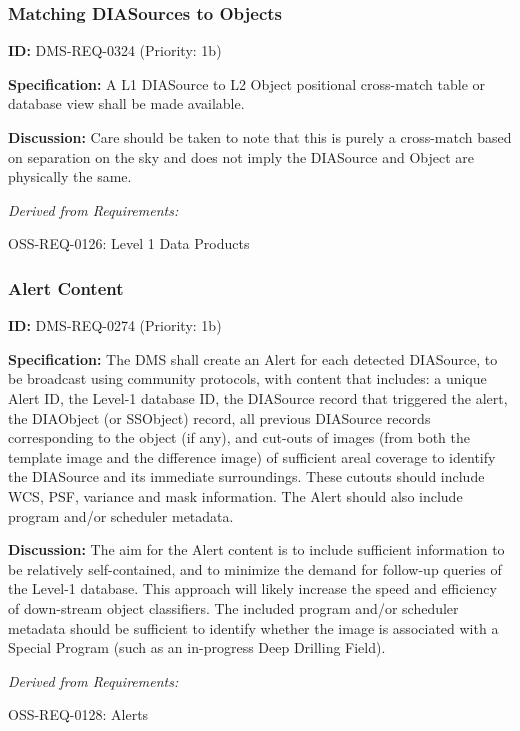 \documentclass[SE,toc,lsstdraft]{lsstdoc}
\begin{document}
\subsubsection{Matching DIASources to Objects}

\label{DMS-REQ-0324}
\textbf{ID:} DMS-REQ-0324 (Priority: 1b)

\textbf{Specification:} A L1 DIASource to L2 Object positional cross-match table or database view shall be made available.

\textbf{Discussion:} Care should be taken to note that this is purely a cross-match based on separation on the sky and does not imply the DIASource and Object are physically the same.

\emph{Derived from Requirements:}

OSS-REQ-0126:
Level 1 Data Products \newline

\subsubsection{Alert Content}

\label{DMS-REQ-0274}
\textbf{ID:} DMS-REQ-0274 (Priority: 1b)

\textbf{Specification:} The DMS shall create an Alert for each detected DIASource, to be broadcast using community protocols, with content that includes: a unique Alert ID, the Level-1 database ID, the DIASource record that triggered the alert, the DIAObject (or SSObject) record, all previous DIASource records corresponding to the object (if any), and cut-outs of images (from both the template image and the difference image) of sufficient areal coverage to identify the DIASource and its immediate surroundings. These cutouts should include WCS, PSF, variance and mask information. The Alert should also include program and/or scheduler metadata.

    \textbf{Discussion: }The aim for the Alert content is to include sufficient information to be relatively self-contained, and to minimize the demand for follow-up queries of the Level-1 database. This approach will likely increase the speed and efficiency of down-stream object classifiers. The included program and/or scheduler metadata should be sufficient to identify whether the image is associated with a Special Program (such as an in-progress Deep Drilling Field).

\emph{Derived from Requirements:}

OSS-REQ-0128:
Alerts \newline
\end{document}
